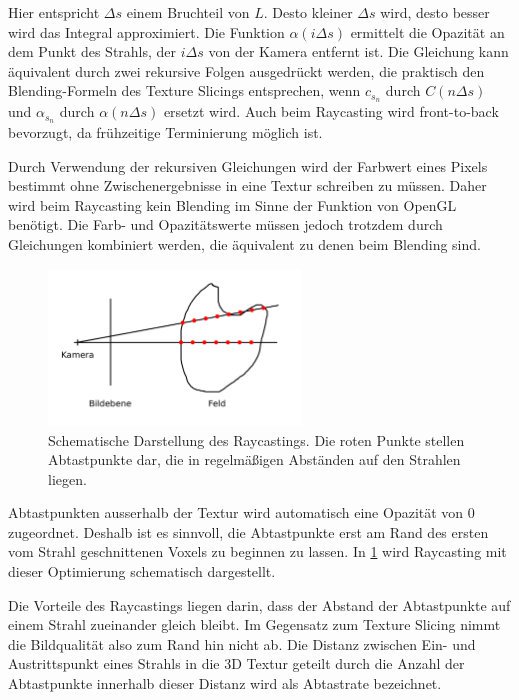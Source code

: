 \documentclass[a4paper,fontsize=12pt,toc=bib,parskip=half,ngerman]{scrartcl}
\begin{document}
Hier entspricht $\Delta s$ einem Bruchteil von $L$. Desto kleiner $\Delta s$ wird, desto besser wird das Integral approximiert. Die Funktion $\alpha(i \Delta s)$ ermittelt die Opazit\"at an dem Punkt des Strahls, der $i \Delta s$ von der Kamera entfernt ist. Die Gleichung kann \"aquivalent durch zwei rekursive Folgen ausgedr\"uckt werden, die praktisch den Blending-Formeln des Texture Slicings entsprechen, wenn $c_{s_n}$ durch $C(n\Delta s)$ und $\alpha_{s_n}$ durch $\alpha(n\Delta s)$ ersetzt wird. Auch beim Raycasting wird front-to-back bevorzugt, da fr\"uhzeitige Terminierung m\"oglich ist.

Durch Verwendung der rekursiven Gleichungen wird der Farbwert eines Pixels bestimmt ohne Zwischenergebnisse in eine Textur schreiben zu m\"ussen. Daher wird beim Raycasting kein Blending im Sinne der Funktion von OpenGL ben\"otigt. Die Farb- und Opazit\"atswerte m\"ussen jedoch trotzdem durch Gleichungen kombiniert werden, die \"aquivalent zu denen beim Blending sind.


\begin{figure}
	\centering
	\includegraphics[width=0.6\textwidth]{pictures/Raycasting}
	\caption{Schematische Darstellung des Raycastings. Die roten Punkte stellen Abtastpunkte dar, die in regelm\"a{\ss}igen Abst\"anden auf den Strahlen liegen.}
	\label{Raycasting}
\end{figure}

Abtastpunkten ausserhalb der Textur wird automatisch eine Opazit\"at von 0 zugeordnet. Deshalb ist es sinnvoll, die Abtastpunkte erst am Rand des ersten vom Strahl geschnittenen Voxels zu beginnen zu lassen. In \cref{Raycasting} wird Raycasting mit dieser Optimierung schematisch dargestellt. 

Die Vorteile des Raycastings liegen darin, dass der Abstand der Abtastpunkte auf einem Strahl zueinander gleich bleibt. Im Gegensatz zum Texture Slicing nimmt die Bildqualit\"at also zum Rand hin nicht ab. Die Distanz zwischen Ein- und Austrittspunkt eines Strahls in die 3D Textur geteilt durch die Anzahl der Abtastpunkte innerhalb dieser Distanz wird als \glq Abtastrate\grq{} bezeichnet.
\end{document}

